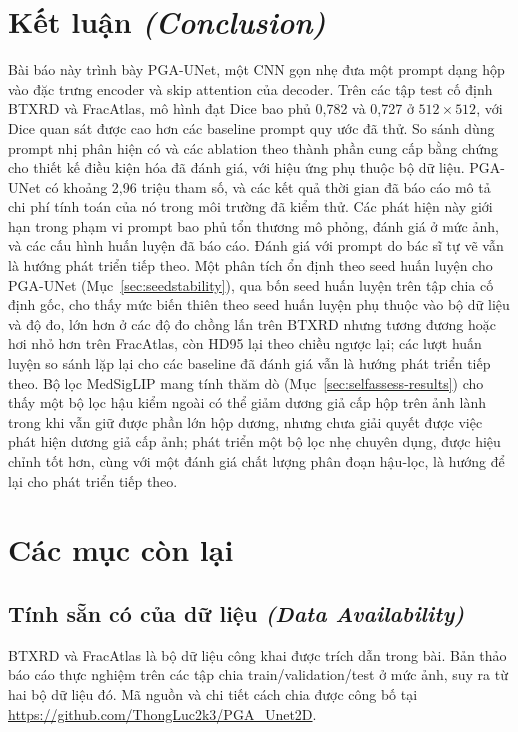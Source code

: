 \documentclass[11pt]{article}
\newcommand{\enlabel}[1]{{\small\itshape\color{gray} (#1)}}
\begin{document}
\section{Kết luận \enlabel{Conclusion}}
Bài báo này trình bày PGA-UNet, một CNN gọn nhẹ đưa một prompt dạng hộp vào đặc trưng encoder và skip attention của decoder. Trên các tập test cố định BTXRD và FracAtlas, mô hình đạt Dice bao phủ 0,782 và 0,727 ở $512\times512$, với Dice quan sát được cao hơn các baseline prompt quy ước đã thử. So sánh dùng prompt nhị phân hiện có và các ablation theo thành phần cung cấp bằng chứng cho thiết kế điều kiện hóa đã đánh giá, với hiệu ứng phụ thuộc bộ dữ liệu. PGA-UNet có khoảng 2,96 triệu tham số, và các kết quả thời gian đã báo cáo mô tả chi phí tính toán của nó trong môi trường đã kiểm thử. Các phát hiện này giới hạn trong phạm vi prompt bao phủ tổn thương mô phỏng, đánh giá ở mức ảnh, và các cấu hình huấn luyện đã báo cáo. Đánh giá với prompt do bác sĩ tự vẽ vẫn là hướng phát triển tiếp theo. Một phân tích ổn định theo seed huấn luyện cho PGA-UNet (Mục~\ref{sec:seedstability}), qua bốn seed huấn luyện trên tập chia cố định gốc, cho thấy mức biến thiên theo seed huấn luyện phụ thuộc vào bộ dữ liệu và độ đo, lớn hơn ở các độ đo chồng lấn trên BTXRD nhưng tương đương hoặc hơi nhỏ hơn trên FracAtlas, còn HD95 lại theo chiều ngược lại; các lượt huấn luyện so sánh lặp lại cho các baseline đã đánh giá vẫn là hướng phát triển tiếp theo. Bộ lọc MedSigLIP mang tính thăm dò (Mục~\ref{sec:selfassess-results}) cho thấy một bộ lọc hậu kiểm ngoài có thể giảm dương giả cấp hộp trên ảnh lành trong khi vẫn giữ được phần lớn hộp dương, nhưng chưa giải quyết được việc phát hiện dương giả cấp ảnh; phát triển một bộ lọc nhẹ chuyên dụng, được hiệu chỉnh tốt hơn, cùng với một đánh giá chất lượng phân đoạn hậu-lọc, là hướng để lại cho phát triển tiếp theo.

\section*{Các mục còn lại}

\subsection*{Tính sẵn có của dữ liệu \enlabel{Data Availability}}
BTXRD và FracAtlas là bộ dữ liệu công khai được trích dẫn trong bài. Bản thảo báo cáo thực nghiệm trên các tập chia train/validation/test ở mức ảnh, suy ra từ hai bộ dữ liệu đó. Mã nguồn và chi tiết cách chia được công bố tại \url{https://github.com/ThongLuc2k3/PGA_Unet2D}.
\end{document}
